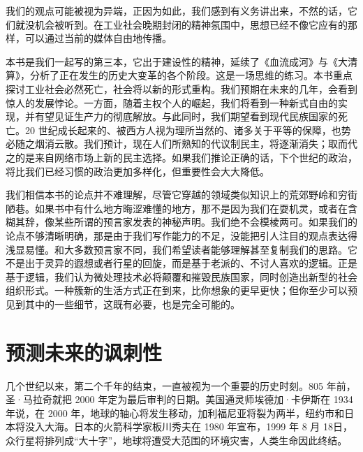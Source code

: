 我们的观点可能被视为异端，正因为如此，我们感到有义务讲出来，不然的话，它们就没机会被听到。在工业社会晚期封闭的精神氛围中，思想已经不像它应有的那样，可以通过当前的媒体自由地传播。


本书是我们一起写的第三本，它出于建设性的精神，延续了《血流成河》与《大清算》，分析了正在发生的历史大变革的各个阶段。这是一场思维的练习。本书重点探讨工业社会必然死亡，社会将以新的形式重构。我们预期在未来的几年，会看到惊人的发展悖论。一方面，随着主权个人的崛起，我们将看到一种新式自由的实现，并有望见证生产力的彻底解放。与此同时，我们期望看到现代民族国家的死亡。20 世纪成长起来的、被西方人视为理所当然的、诸多关于平等的保障，也势必随之烟消云散。我们预计，现在人们所熟知的代议制民主，将逐渐消失；取而代之的是来自网络市场上新的民主选择。如果我们推论正确的话，下个世纪的政治，将比我们已经习惯的政治更加多样化，但重要性会大大降低。


我们相信本书的论点并不难理解，尽管它穿越的领域类似知识上的荒郊野岭和穷街陋巷。如果书中有什么地方晦涩难懂的地方，那不是因为我们在耍机灵，或者在含糊其辞，像某些所谓的预言家发表的神秘声明。我们绝不会模棱两可。如果我们的论点不够清晰明确，那是由于我们写作能力的不足，没能把引人注目的观点表达得浅显易懂。和大多数预言家不同，我们希望读者能够理解甚至复制我们的思路。它不是出于灵异的遐想或者行星的回旋，而是基于老派的、不讨人喜欢的逻辑。正是基于逻辑，我们认为微处理技术必将颠覆和摧毁民族国家，同时创造出新型的社会组织形式。一种簇新的生活方式正在到来，比你想象的更早更快；但你至少可以预见到其中的一些细节，这既有必要，也是完全可能的。


\section{预测未来的讽刺性}
几个世纪以来，第二个千年的结束，一直被视为一个重要的历史时刻。805 年前，圣·马拉奇就把 2000 年定为最后审判的日期。美国通灵师埃德加·卡伊斯在 1934年说，在 2000 年，地球的轴心将发生移动，加利福尼亚将裂为两半，纽约市和日本将没入大海。日本的火箭科学家板川秀夫在 1980 年宣布，1999 年 8 月 18日，众行星将排列成“大十字”，地球将遭受大范围的环境灾害，人类生命因此终结。



